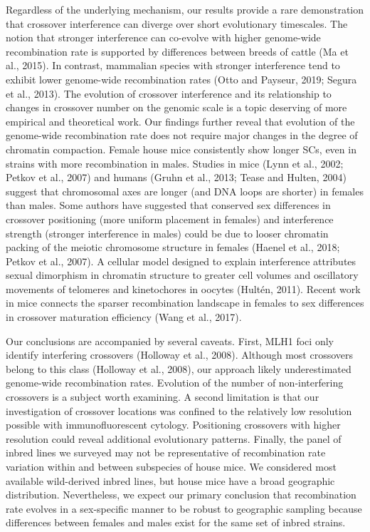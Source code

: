 \documentclass[
]{article}
\begin{document}
Regardless of the underlying mechanism, our results provide a rare
demonstration that crossover interference can diverge over short
evolutionary timescales. The notion that stronger interference can
co-evolve with higher genome-wide recombination rate is supported by
differences between breeds of cattle (Ma et al., 2015). In contrast,
mammalian species with stronger interference tend to exhibit lower
genome-wide recombination rates (Otto and Payseur, 2019; Segura et al.,
2013). The evolution of crossover interference and its relationship to
changes in crossover number on the genomic scale is a topic deserving of
more empirical and theoretical work. Our findings further reveal that
evolution of the genome-wide recombination rate does not require major
changes in the degree of chromatin compaction. Female house mice
consistently show longer SCs, even in strains with more recombination in
males. Studies in mice (Lynn et al., 2002; Petkov et al., 2007) and
humans (Gruhn et al., 2013; Tease and Hulten, 2004) suggest that
chromosomal axes are longer (and DNA loops are shorter) in females than
males. Some authors have suggested that conserved sex differences in
crossover positioning (more uniform placement in females) and
interference strength (stronger interference in males) could be due to
looser chromatin packing of the meiotic chromosome structure in females
(Haenel et al., 2018; Petkov et al., 2007). A cellular model designed to
explain interference attributes sexual dimorphism in chromatin structure
to greater cell volumes and oscillatory movements of telomeres and
kinetochores in oocytes (Hultén, 2011). Recent work in mice connects the
sparser recombination landscape in females to sex differences in
crossover maturation efficiency (Wang et al., 2017).

Our conclusions are accompanied by several caveats. First, MLH1 foci
only identify interfering crossovers (Holloway et al., 2008). Although
most crossovers belong to this class (Holloway et al., 2008), our
approach likely underestimated genome-wide recombination rates.
Evolution of the number of non-interfering crossovers is a subject worth
examining. A second limitation is that our investigation of crossover
locations was confined to the relatively low resolution possible with
immunofluorescent cytology. Positioning crossovers with higher
resolution could reveal additional evolutionary patterns. Finally, the
panel of inbred lines we surveyed may not be representative of
recombination rate variation within and between subspecies of house
mice. We considered most available wild-derived inbred lines, but house
mice have a broad geographic distribution. Nevertheless, we expect our
primary conclusion that recombination rate evolves in a sex-specific
manner to be robust to geographic sampling because differences between
females and males exist for the same set of inbred strains.
\end{document}

